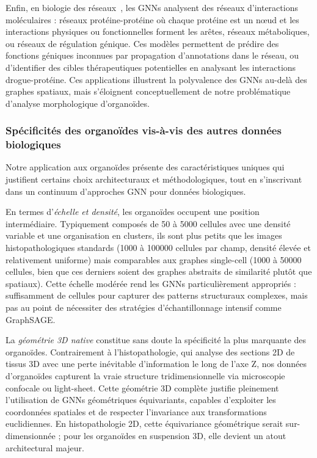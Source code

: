 Enfin, en biologie des réseaux~\cite{Zhang2021GNN}, les GNNs analysent des réseaux d'interactions moléculaires : réseaux protéine-protéine où chaque protéine est un nœud et les interactions physiques ou fonctionnelles forment les arêtes, réseaux métaboliques, ou réseaux de régulation génique. Ces modèles permettent de prédire des fonctions géniques inconnues par propagation d'annotations dans le réseau, ou d'identifier des cibles thérapeutiques potentielles en analysant les interactions drogue-protéine. Ces applications illustrent la polyvalence des GNNs au-delà des graphes spatiaux, mais s'éloignent conceptuellement de notre problématique d'analyse morphologique d'organoïdes.

\subsubsection{Spécificités des organoïdes vis-à-vis des autres données biologiques}

Notre application aux organoïdes présente des caractéristiques uniques qui justifient certains choix architecturaux et méthodologiques, tout en s'inscrivant dans un continuum d'approches GNN pour données biologiques.

En termes d'\textit{échelle et densité}, les organoïdes occupent une position intermédiaire. Typiquement composés de 50 à 5000 cellules avec une densité variable et une organisation en clusters, ils sont plus petits que les images histopathologiques standards (1000 à 100000 cellules par champ, densité élevée et relativement uniforme) mais comparables aux graphes single-cell (1000 à 50000 cellules, bien que ces derniers soient des graphes abstraits de similarité plutôt que spatiaux). Cette échelle modérée rend les GNNs particulièrement appropriés : suffisamment de cellules pour capturer des patterns structuraux complexes, mais pas au point de nécessiter des stratégies d'échantillonnage intensif comme GraphSAGE.

La \textit{géométrie 3D native} constitue sans doute la spécificité la plus marquante des organoïdes. Contrairement à l'histopathologie, qui analyse des sections 2D de tissus 3D avec une perte inévitable d'information le long de l'axe Z, nos données d'organoïdes capturent la vraie structure tridimensionnelle via microscopie confocale ou light-sheet. Cette géométrie 3D complète justifie pleinement l'utilisation de GNNs géométriques équivariants, capables d'exploiter les coordonnées spatiales et de respecter l'invariance aux transformations euclidiennes. En histopathologie 2D, cette équivariance géométrique serait sur-dimensionnée ; pour les organoïdes en suspension 3D, elle devient un atout architectural majeur.

